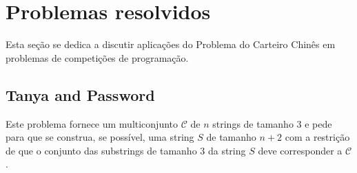 \documentclass[12pt, a4paper]{article}
\begin{document}
%
%
%        
%
%
%
%
%
%

    \section{Problemas resolvidos}

        Esta seção se dedica a discutir aplicações do Problema do Carteiro Chinês em problemas de competições de programação.

        \subsection{Tanya and Password}

        Este problema\cite{tanya} fornece um multiconjunto $\mathcal{C}$ de $n$ strings de tamanho 3 e pede para que se construa, se possível, uma string $S$ de tamanho $n+2$ com a restrição de que o conjunto das substrings de tamanho 3 da string $S$ deve corresponder a $\mathcal{C}$.
\end{document}
